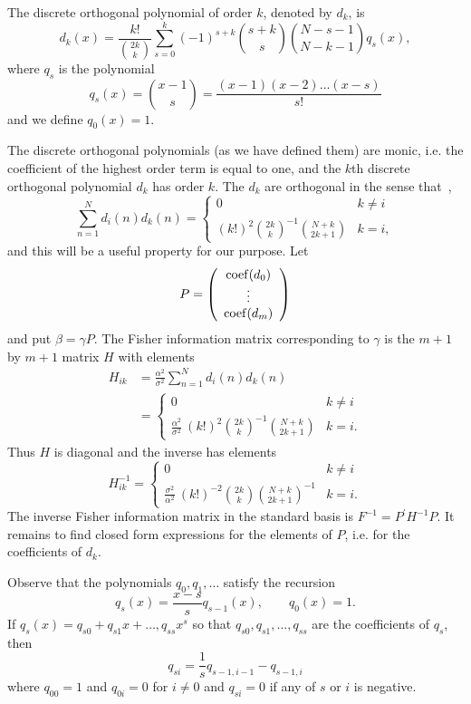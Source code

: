 \documentclass[journal,10pt]{IEEEtran}
\begin{document}
\begin{definition}  \label{def:discreteLegendepolys}
The discrete orthogonal polynomial of order $k$, denoted by $d_k$, is
\[
d_k(x) = \frac{k!}{\binom{2k}{k}}\sum_{s=0}^k{(-1)^{s+k}\binom{s+k}{s}\binom{N-s-1}{N-k-1}q_s(x)},
\]
where $q_s$ is the polynomial
\[
q_s(x) = \binom{x-1}{s} = \frac{(x-1)(x-2)\dots(x-s)}{s!}
\]
and we define $q_0(x) = 1$.
\end{definition}
The discrete orthogonal polynomials (as we have defined them) are monic, i.e. the coefficient of the highest order term is equal to one, and the $k$th discrete orthogonal polynomial $d_k$ has order $k$.  The $d_k$ are orthogonal in the sense that~\cite{Szego1975_ortho_polynomials,Eisinberg2001_Vandermonde_rect,Eisinberg2007_discerete_otho_poly_equidist},
\[
\sum_{n=1}^{N}{ d_i(n) d_k(n) } = \begin{cases}
0 &  k\neq i \\
(k!)^2 \binom{2k}{k}^{-1} \binom{N+k}{2k+1}  & k = i,
\end{cases}
\]
and this will be a useful property for our purpose.  Let 
\[
P = \left( \begin{array}{c}
\operatorname{coef}(d_0) \\
\vdots \\
\operatorname{coef}(d_m)
\end{array} \right)
\]
and put $\beta = \gamma P$.  The Fisher information matrix corresponding to $\gamma$ is the $m+1$ by $m+1$ matrix $H$ with elements
\begin{align*}
H_{ik} &= \frac{\alpha^2}{\sigma^2}\sum_{n=1}^{N} d_{i}(n) d_{k}(n) \\
&= \begin{cases}
0 &  k\neq i \\
 \frac{\alpha^2}{\sigma^2}\ (k!)^2 \binom{2k}{k}^{-1} \binom{N+k}{2k+1}  & k = i.
\end{cases}
\end{align*}
Thus $H$ is diagonal and the inverse has elements
\[
H_{ik}^{-1} = \begin{cases}
0 &  k\neq i \\
 \frac{\sigma^2}{\alpha^2}\ (k!)^{-2} \binom{2k}{k} \binom{N+k}{2k+1}^{-1}  & k = i.
\end{cases}
\] 
The inverse Fisher information matrix in the standard basis is $F^{-1} = P^\prime H^{-1} P$.  It remains to find closed form expressions for the elements of $P$, i.e. for the coefficients of $d_k$.  

Observe that the polynomials $q_0,q_1,\dots$ satisfy the recursion
\[
q_s(x) = \frac{x-s}{s} q_{s-1}(x), \qquad q_{0}(x) = 1.
\]
If $q_s(x) = q_{s0} + q_{s1}x + \dots, q_{ss}x^s$ so that $q_{s0},q_{s1},\dots,q_{ss}$ are the coefficients of $q_{s}$, then
\[
q_{si} = \frac{1}{s}q_{s-1,i-1} - q_{s-1,i}
\]
where $q_{00}=1$ and $q_{0i}=0$ for $i \neq 0$ and $q_{si} = 0$ if any of $s$ or $i$ is negative.
\end{document}
